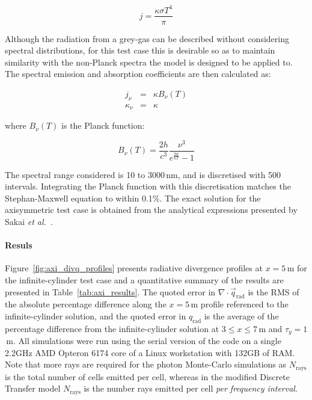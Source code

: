 \begin{equation}
 j = \frac{\kappa \sigma T^{4}}{\pi}
 \label{eq:grey_emission}
\end{equation}


Although the radiation from a grey-gas can be described without considering spectral distributions, for this test case this is desirable so as to maintain similarity with the non-Planck spectra the model is designed to be applied to.
The spectral emission and absorption coefficients are then calculated as:

\begin{eqnarray}
      j_{\nu} &=& \kappa B_{\nu}(T) \\
 \kappa_{\nu} &=& \kappa 
\end{eqnarray}

\noindent where $B_{\nu}(T)$ is the Planck function:

\begin{equation}
 B_{\nu}(T) = \frac{2 h}{c^3} \frac{\nu^3}{e^\frac{h \nu }{k T} -1 }
\end{equation}

The spectral range considered is 10 to 3000\,nm, and is discretised with 500 intervals.
Integrating the Planck function with this discretisation matches the Stephan-Maxwell equation to within 0.1\%.
The exact solution for the axisymmetric test case is obtained from the analytical expressions presented by Sakai \textit{et al.}~\cite{SSM1998}.

\paragraph{Resuls}

Figure~\ref{fig:axi_divq_profiles} presents radiative divergence profiles at $x=5$\,m for the infinite-cylinder test case and a quantitative summary of the results are presented in Table~\ref{tab:axi_results}.
The quoted error in $\nabla \cdot \vec{q}_\text{rad}$ is the RMS of the absolute percentage difference along the $x=5$\,m profile referenced to the infinite-cylinder solution, and the quoted error in $q_\text{rad}$ is the average of the percentage difference from the infinite-cylinder solution at $3 \leq x \leq 7$\,m and $\tau_y=1$\,m.
All simulations were run using the serial version of the code on a single 2.2GHz AMD Opteron 6174 core of a Linux workstation with 132GB of RAM.
Note that more rays are required for the photon Monte-Carlo simulations as $N_\text{rays}$ is the total number of cells emitted per cell, whereas in the modified Discrete Transfer model $N_\text{rays}$ is the number rays emitted per cell \textit{per frequency interval}.

